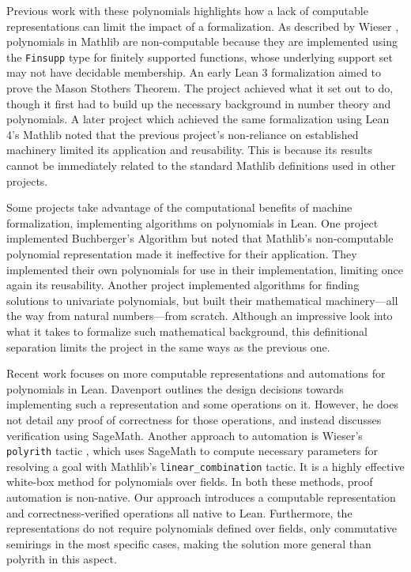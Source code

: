 
Previous work with these polynomials highlights how a lack of computable representations can limit the impact of a formalization. As described by Wieser \cite{ComputationalPolynomialsFinsupps}, polynomials in Mathlib are non-computable because they are implemented using the \lstinline{Finsupp} type for finitely supported functions, whose underlying support set may not have decidable membership. An early Lean 3 formalization \cite{MasonStothers2018} aimed to prove the Mason Stothers Theorem. The project achieved what it set out to do, though it first had to build up the necessary background in number theory and polynomials. A later project \cite{MasonStothers2024} which achieved the same formalization using Lean 4’s Mathlib noted that the previous project’s non-reliance on established machinery limited its application and reusability. This is because its results cannot be immediately related to the standard Mathlib definitions used in other projects.

Some projects take advantage of the computational benefits of machine formalization, implementing algorithms on polynomials in Lean. One project implemented Buchberger’s Algorithm \cite{Buchbergers2019} but noted that Mathlib’s non-computable polynomial representation made it ineffective for their application. They implemented their own polynomials for use in their implementation, limiting once again its reusability. Another project \cite{UnivariateSolutions2022} implemented algorithms for finding solutions to univariate polynomials, but built their mathematical machinery---all the way from natural numbers---from scratch. Although an impressive look into what it takes to formalize such mathematical background, this definitional separation limits the project in the same ways as the previous one.

Recent work focuses on more computable representations and automations for polynomials in Lean. Davenport \cite{ComputationalPolynomials2024} outlines the design decisions towards implementing such a representation and some operations on it. However, he does not detail any proof of correctness for those operations, and instead discusses verification using SageMath. Another approach to automation is Wieser’s \lstinline{polyrith} tactic \cite{Polyrith}, which uses SageMath to compute necessary parameters for resolving a goal with Mathlib’s \lstinline{linear_combination} tactic. It is a highly effective white-box method for polynomials over fields. In both these methods, proof automation is non-native. Our approach introduces a computable representation and correctness-verified operations all native to Lean. Furthermore, the representations do not require polynomials defined over fields, only commutative semirings in the most specific cases, making the solution more general than polyrith in this aspect.


